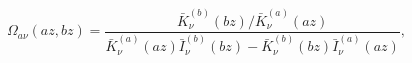 \begin{equation}
\Omega _{a\nu }(az,bz)=\frac{\bar{K}_{\nu }^{(b)}(bz)/\bar{K}_{\nu
}^{(a)}(az)}{\bar{K}_{\nu }^{(a)}(az)\bar{I}_{\nu }^{(b)}(bz)-\bar{K}_{\nu
}^{(b)}(bz)\bar{I}_{\nu }^{(a)}(az)},  \label{Omega}
\end{equation}

